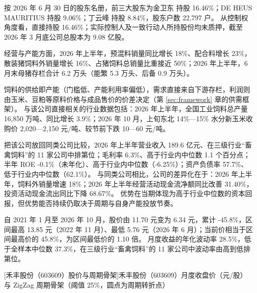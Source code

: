  按 2026 年 6 月 30 日的股东名册，前三大股东为金卫东 持股 16.46\%；DE HEUS MAURITIUS 持股 9.06\%；丁云峰 持股 8.84\%，股东户数 22,797 户。 从控制权角度看，直接持股 16.46\%；实际控制人及一致行动人所持股份均未质押，截至 2026 年 3 月底公司总股本为 9.08 亿股。

 经营与产能方面，2026 年上半年，预混料销量同比增长 18\%、配合料增长 23\%，散装猪饲料外销量增长 16\%、占猪饲料总销量比重接近 50\%；2026 年上半年，6 月末母猪存栏合计 6.2 万头（能繁 5.3 万头、后备 0.9 万头）。

 饲料的供给即产能（门槛低、产能利用率偏低），需求直接来自下游存栏，利润则由玉米、豆粕等原料价格与成品售价的价差决定（第 \ref{sec:framework} 章的供需框架）。 与该公司直接相关的行业数据包括：2026 年上半年，全国工业饲料总产量 16,850 万吨、同比增长 3.9\%；2026 年 10 月，上旬东北 14\%—15\% 水分新玉米收购价 2,020—2,150 元/吨、较节前下跌 10—60 元/吨。

 把该公司放回同类公司比较，2026 年上半年营业收入 189.6 亿元、在三级行业“畜禽饲料”的 11 家公司中排第位；毛利率 6.3\%、高于行业内中位数 1.1 个百分点；半年 ROE -0.1\%（未年化）、高于行业内中位数（-6.25\%）；资产负债率 57.7\%、低于行业内中位数（62.1\%）。 与同类公司相比，公司的差异化在于：2026 年上半年，饲料外销量增速 18\%；2026 年上半年经营活动现金流净额同比改善 31.40\%，投资活动现金流出同比下降 68.67\%。 优势在当期体现为高于行业中位数的资本回报，但优势能否持续仍取决于周期与自身产能投放节奏。

 自 2021 年 1 月至 2026 年 10 月，股价由 11.70 元变为 6.34 元，累计 -45.8\%，区间最高 13.85 元（2022 年 11 月）、最低 5.76 元（2026 年 6 月）；当前价相当于区间最高价的 45.8\%，为区间最低价的 1.10 倍。 月度收益的年化波动率 28.5\%，低于全样本中位数 37.3\%，在三级行业“畜禽饲料”的 11 家公司中波动率由高到低排第位。

\begin{center}
\begin{minipage}{\textwidth}\centering
{}

[禾丰股份（603609）股价与周期骨架]{禾丰股份（603609）月度收盘价（元/股）与 ZigZag 周期骨架（阈值 25\%，圆点为周期转折点）}
\end{minipage}
\end{center}

